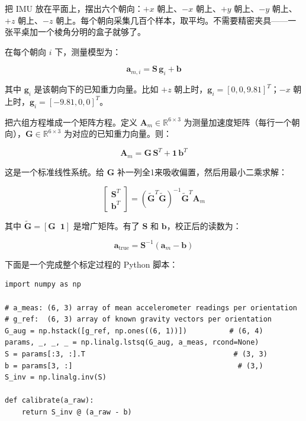 把 IMU 放在平面上，摆出六个朝向：$+x$ 朝上、$-x$ 朝上、$+y$ 朝上、$-y$ 朝上、$+z$ 朝上、$-z$ 朝上。每个朝向采集几百个样本，取平均。不需要精密夹具——一张平桌加一个棱角分明的盒子就够了。

在每个朝向 $i$ 下，测量模型为：

\begin{equation}
\mathbf{a}_{m,i} = \mathbf{S} \, \mathbf{g}_i + \mathbf{b}
\end{equation}

其中 $\mathbf{g}_i$ 是该朝向下的已知重力向量。比如 $+z$ 朝上时，$\mathbf{g}_i = [0, 0, 9.81]^T$；$-x$ 朝上时，$\mathbf{g}_i = [-9.81, 0, 0]^T$。

把六组方程堆成一个矩阵方程。定义 $\mathbf{A}_m \in \mathbb{R}^{6 \times 3}$ 为测量加速度矩阵（每行一个朝向），$\mathbf{G} \in \mathbb{R}^{6 \times 3}$ 为对应的已知重力向量。则：

\begin{equation}
\mathbf{A}_m = \mathbf{G} \, \mathbf{S}^T + \mathbf{1} \, \mathbf{b}^T
\end{equation}

这是一个标准线性系统。给 $\mathbf{G}$ 补一列全1来吸收偏置，然后用最小二乘求解：

\begin{equation}
\begin{bmatrix} \mathbf{S}^T \\ \mathbf{b}^T \end{bmatrix}
= \left( \tilde{\mathbf{G}}^T \tilde{\mathbf{G}} \right)^{-1} \tilde{\mathbf{G}}^T \mathbf{A}_m
\end{equation}

其中 $\tilde{\mathbf{G}} = [\mathbf{G} \;\; \mathbf{1}]$ 是增广矩阵。有了 $\mathbf{S}$ 和 $\mathbf{b}$，校正后的读数为：

\begin{equation}
\mathbf{a}_{\text{true}} = \mathbf{S}^{-1} (\mathbf{a}_m - \mathbf{b})
\end{equation}

下面是一个完成整个标定过程的 Python 脚本：

\begin{verbatim}
import numpy as np

# a_meas: (6, 3) array of mean accelerometer readings per orientation
# g_ref:  (6, 3) array of known gravity vectors per orientation
G_aug = np.hstack([g_ref, np.ones((6, 1))])          # (6, 4)
params, _, _, _ = np.linalg.lstsq(G_aug, a_meas, rcond=None)
S = params[:3, :].T                                   # (3, 3)
b = params[3, :]                                       # (3,)
S_inv = np.linalg.inv(S)

def calibrate(a_raw):
    return S_inv @ (a_raw - b)
\end{verbatim}

